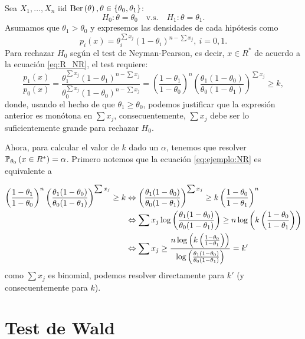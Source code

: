 \begin{example}
	Sea $X_1,\ldots, X_n$ iid $\text{Ber}\left(\theta\right), \theta\in\{\theta_0,\theta_1\}$: 
	\begin{equation}
		H_0:\theta =\theta_0\quad \text{v.s.}\quad H_1:\theta = \theta_1.
	\end{equation} 
	Asumamos que $\theta_1>\theta_0$ y expresemos las densidades de cada hipótesis como 
	\begin{equation}
		p_i(x) = \theta_i^{\sum x_j}(1-\theta_i)^{n-\sum x_j},\ i=0,1.
	\end{equation}
	Para rechazar $H_0$ según el test de Neyman-Pearson, es decir, $x\in R^*$ de acuerdo a la ecuación \eqref{eq:R_NR}, el test requiere: 
	\begin{equation}
		\label{eq:ejemplo:NR}
		\frac{p_1(x)}{p_0(x)} = \frac{\theta_1^{\sum x_j}(1-\theta_1)^{n-\sum x_j}}{\theta_0^{\sum x_j}(1-\theta_0)^{n-\sum x_j}} = \left(\frac{1-\theta_1}{1-\theta_0}\right)^n\left(\frac{\theta_1(1-\theta_0)}{\theta_0(1-\theta_1)}\right)^{\sum x_j}\geq k,
	\end{equation}
	donde, usando el hecho de que $\theta_1\geq\theta_0$, podemos justificar que la expresión anterior es monótona en  $\sum x_j$, consecuentemente, $\sum x_j$ debe ser lo suficientemente grande para rechazar $H_0$.

	Ahora, para calcular el valor de $k$ dado un $\alpha$, tenemos que resolver $\mathbb{P}_{\theta_0} \left(x\in R^*\right) = \alpha$. Primero notemos que la ecuación \eqref{eq:ejemplo:NR} es equivalente a 

	\begin{align}
	 	\left(\frac{1-\theta_1}{1-\theta_0}\right)^n\left(\frac{\theta_1(1-\theta_0)}{\theta_0(1-\theta_1)}\right)^{\sum x_j}\geq k 
	 	& \Leftrightarrow 
	 	\left(\frac{\theta_1(1-\theta_0)}{\theta_0(1-\theta_1)}\right)^{\sum x_j}\geq k \left(\frac{1-\theta_0}{1-\theta_1}\right)^n\\
	 	& \Leftrightarrow 
	 	\sum x_j \log\left(\frac{\theta_1(1-\theta_0)}{\theta_0(1-\theta_1)}\right)\geq n \log\left(k \left(\frac{1-\theta_0}{1-\theta_1}\right)\right) \nonumber\\
	 	& \Leftrightarrow 
	 	\sum x_j \geq \frac{n \log\left(k \left(\frac{1-\theta_0}{1-\theta_1}\right)\right)}{\log\left(\frac{\theta_1(1-\theta_0)}{\theta_0(1-\theta_1)}\right)} = k' \nonumber
	 \end{align} 
	 como $\sum x_j$ es binomial, podemos resolver directamente para $k'$ (y consecuentemente para $k$).
\end{example}


\section{Test de Wald} 
\label{sub:test_de_wald}

